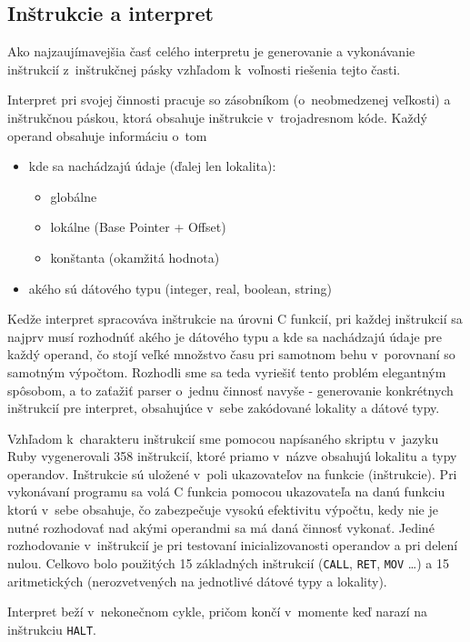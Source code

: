 \documentclass[12pt,a4paper,titlepage,final]{article}
\begin{document}
\subsection{Inštrukcie a interpret}
Ako najzaujímavejšia časť celého interpretu je generovanie a vykonávanie inštrukcií
z~inštrukčnej pásky vzhľadom k~voľnosti riešenia tejto časti.

Interpret pri svojej činnosti pracuje so zásobníkom (o~neobmedzenej veľkosti) a
inštrukčnou páskou, ktorá obsahuje inštrukcie v~trojadresnom kóde.
Každý operand obsahuje informáciu o~tom 
\begin{itemize}
	\item kde sa nachádzajú údaje (ďalej len lokalita):
		\begin{itemize}
			\item globálne
			\item lokálne (Base Pointer + Offset)
			\item konštanta (okamžitá hodnota)
		\end{itemize}
	\item akého sú dátového typu (integer, real, boolean, string)
\end{itemize}

Kedže interpret spracováva inštrukcie na úrovni C funkcií, pri každej inštrukcií
 sa najprv musí rozhodnúť akého je dátového typu a kde sa nachádzajú údaje pre 
 každý operand, čo stojí veľké množstvo času pri samotnom behu v~porovnaní 
 so samotným výpočtom.
Rozhodli sme sa teda vyriešiť tento problém elegantným spôsobom, 
 a to zaťažiť parser o~jednu činnosť navyše - generovanie konkrétnych 
 inštrukcií pre interpret, obsahujúce v~sebe zakódované lokality a dátové typy.

Vzhľadom k~charakteru inštrukcií sme pomocou napísaného skriptu v~jazyku Ruby
 vygenerovali 358 inštrukcií, 
 ktoré priamo v~názve obsahujú lokalitu a typy operandov.
Inštrukcie sú uložené v~poli ukazovateľov na funkcie (inštrukcie).
 Pri vykonávaní programu sa volá C funkcia pomocou ukazovateľa na danú 
 funkciu ktorú v~sebe obsahuje, čo zabezpečuje vysokú efektivitu výpočtu,
 kedy nie je nutné rozhodovať nad akými operandmi sa má daná činnosť vykonať.
 Jediné rozhodovanie v~inštrukcií je pri testovaní inicializovanosti operandov a pri delení nulou. Celkovo bolo použitých 15 základných inštrukcií (\texttt{CALL}, \texttt{RET}, \texttt{MOV} \ldots) a 
 15 aritmetických (nerozvetvených na jednotlivé dátové typy a lokality).

Interpret beží v~nekonečnom cykle, pričom končí v~momente keď narazí na inštrukciu
\texttt{HALT}.
\end{document}
